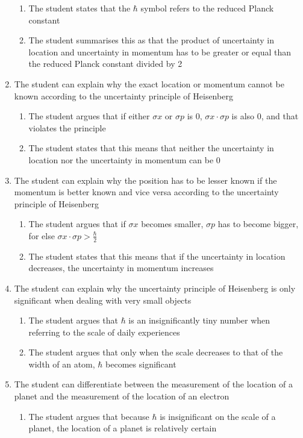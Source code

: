 \documentclass[11pt,twoside]{report} %
\begin{document}
\begin{enumerate}
\begin{enumerate}
\item The student states that the $\hbar$ symbol refers to the reduced Planck constant
\item The student summarises this as that the product of uncertainty in location and uncertainty in momentum has to be greater or equal than the reduced Planck constant divided by 2
\end{enumerate}
\item The student can explain why the exact location or momentum cannot be known according to the uncertainty principle of Heisenberg
\begin{enumerate}
\item The student argues that if either $\sigma x$ or $\sigma p$ is 0, $\sigma x \cdot \sigma p$ is also 0, and that violates the principle
\item The student states that this means that neither the uncertainty in location nor the uncertainty in momentum can be 0
\end{enumerate}
\item The student can explain why the position has to be lesser known if the momentum is better known and vice versa according to the uncertainty principle of Heisenberg
\begin{enumerate}
\item The student argues that if $\sigma x$ becomes smaller, $\sigma p$ has to become bigger, for else $\sigma x \cdot \sigma p > \frac{\hbar}{2}$
\item The student states that this means that if the uncertainty in location decreases, the uncertainty in momentum increases 
\end{enumerate}
\item The student can explain why the uncertainty principle of Heisenberg is only significant when dealing with very small objects
\begin{enumerate}
\item The student argues that $\hbar$ is an insignificantly tiny number when referring to the scale of daily experiences
\item The student argues that only when the scale decreases to that of the width of an atom, $\hbar$ becomes significant
\end{enumerate}
\item The student can differentiate between the measurement of the location of a planet and the measurement of the location of an electron
\begin{enumerate}
\item The student argues that because $\hbar$ is insignificant on the scale of a planet, the location of a planet is relatively certain

\end{enumerate}
\end{enumerate}
\end{document}
